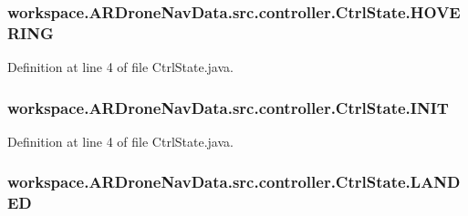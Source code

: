 \subsubsection[{H\+O\+V\+E\+R\+I\+N\+G}]{\setlength{\rightskip}{0pt plus 5cm}workspace.\+A\+R\+Drone\+Nav\+Data.\+src.\+controller.\+Ctrl\+State.\+H\+O\+V\+E\+R\+I\+N\+G}\label{enumworkspace_1_1_a_r_drone_nav_data_1_1src_1_1controller_1_1_ctrl_state_aa506078421e4eee0e30aa759ea7b1f30}


Definition at line 4 of file Ctrl\+State.\+java.

\hypertarget{enumworkspace_1_1_a_r_drone_nav_data_1_1src_1_1controller_1_1_ctrl_state_ac0c37bcebc4cac0ffcf936038c66e192}{}
\subsubsection[{I\+N\+I\+T}]{\setlength{\rightskip}{0pt plus 5cm}workspace.\+A\+R\+Drone\+Nav\+Data.\+src.\+controller.\+Ctrl\+State.\+I\+N\+I\+T}\label{enumworkspace_1_1_a_r_drone_nav_data_1_1src_1_1controller_1_1_ctrl_state_ac0c37bcebc4cac0ffcf936038c66e192}


Definition at line 4 of file Ctrl\+State.\+java.

\hypertarget{enumworkspace_1_1_a_r_drone_nav_data_1_1src_1_1controller_1_1_ctrl_state_afd1cd7a74bb1b365d575b7b113cdd345}{}
\subsubsection[{L\+A\+N\+D\+E\+D}]{\setlength{\rightskip}{0pt plus 5cm}workspace.\+A\+R\+Drone\+Nav\+Data.\+src.\+controller.\+Ctrl\+State.\+L\+A\+N\+D\+E\+D}\label{enumworkspace_1_1_a_r_drone_nav_data_1_1src_1_1controller_1_1_ctrl_state_afd1cd7a74bb1b365d575b7b113cdd345}


